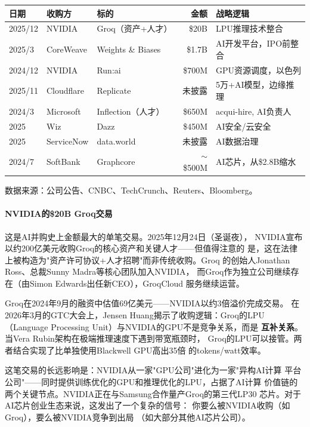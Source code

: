 \begin{keybox}[2024--2026 重大AI并购交易汇总]
\small
\begin{tabularx}{\textwidth}{l l l r X}
\toprule
\rowcolor{figLightGray}
\textbf{日期} & \textbf{收购方} & \textbf{标的}
  & \textbf{金额} & \textbf{战略逻辑} \\
\midrule
2025/12 & NVIDIA   & Groq（资产+人才）  & \$20B
  & LPU推理技术整合 \\
2025/3  & CoreWeave & Weights \& Biases  & \$1.7B
  & AI开发平台，IPO前整合 \\
2024/12 & NVIDIA   & Run:ai             & \$700M
  & GPU资源调度，以色列 \\
2025/11 & Cloudflare & Replicate         & 未披露
  & 5万+AI模型，边缘推理 \\
2024/3  & Microsoft & Inflection（人才） & \$650M
  & acqui-hire, AI负责人 \\
2025    & Wiz      & Dazz               & \$450M
  & AI安全/云安全 \\
2025    & ServiceNow & data.world        & 未披露
  & AI数据治理 \\
2024/7  & SoftBank & Graphcore          & $\sim$\$500M
  & AI芯片，从\$2.8B缩水 \\
\bottomrule
\end{tabularx}

\medskip
\noindent 数据来源：公司公告、CNBC、TechCrunch、Reuters、Bloomberg。
\end{keybox}

\paragraph{NVIDIA的\$20B Groq交易}

这是AI并购史上金额最大的单笔交易。2025年12月24日（圣诞夜），
NVIDIA宣布以约200亿美元收购Groq的核心资产和关键人才——但值得注意的
是，这在法律上被构造为"资产许可协议+人才招聘"而非传统收购。Groq
的创始人Jonathan Ross、总裁Sunny Madra等核心团队加入NVIDIA，
而Groq作为独立公司继续存在（由Simon Edwards出任新CEO），GroqCloud
服务继续运营。

Groq在2024年9月的融资中估值69亿美元——NVIDIA以约3倍溢价完成交易。
在2026年3月的GTC大会上，Jensen Huang揭示了收购逻辑：Groq的LPU
（Language Processing Unit）与NVIDIA的GPU不是竞争关系，而是
\textbf{互补关系}。当Vera Rubin架构在极端推理速度下遇到带宽瓶颈时，
Groq的LPU可以接管。两者结合实现了比单独使用Blackwell GPU高出35倍
的tokens/watt效率。

这笔交易的长远影响是：NVIDIA从一家"GPU公司"进化为一家"异构AI计算
平台公司"——同时提供训练优化的GPU和推理优化的LPU，占据了AI计算
价值链的两个关键节点。NVIDIA正在与Samsung合作量产Groq的第三代LP30
芯片。对于AI芯片创业生态来说，这发出了一个复杂的信号：
你要么被NVIDIA收购（如Groq），要么被NVIDIA竞争到出局
（如大部分其他AI芯片公司）。


